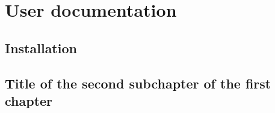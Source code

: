 \chapter{User documentation}


\section{Installation}

\section{Title of the second subchapter of the first chapter}

